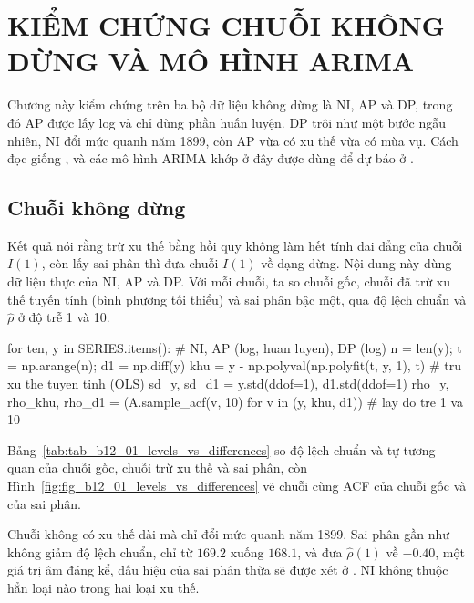\clearpage
\section[Kiểm chứng chuỗi không dừng và mô hình ARIMA]{KIỂM CHỨNG CHUỖI KHÔNG DỪNG VÀ MÔ HÌNH ARIMA}

Chương này kiểm chứng  trên ba bộ dữ liệu không dừng là NI, AP và DP, trong đó AP được lấy log và chỉ dùng phần huấn luyện. DP trôi như một bước ngẫu nhiên, NI đổi mức quanh năm 1899, còn AP vừa có xu thế vừa có mùa vụ. Cách đọc giống , và các mô hình ARIMA khớp ở đây được dùng để dự báo ở .

\subsection{Chuỗi không dừng}

 Kết quả  nói rằng trừ xu thế bằng hồi quy không làm hết tính dai dẳng của chuỗi $I(1)$, còn lấy sai phân thì đưa chuỗi $I(1)$ về dạng dừng.
 Nội dung này dùng dữ liệu thực của NI, AP và DP. Với mỗi chuỗi, ta so chuỗi gốc, chuỗi đã trừ xu thế tuyến tính (bình phương tối thiểu) và sai phân bậc một, qua độ lệch chuẩn và $\hat\rho$ ở độ trễ 1 và 10.
\begin{codeblock}
for ten, y in SERIES.items():                      # NI, AP (log, huan luyen), DP (log)
    n = len(y); t = np.arange(n); d1 = np.diff(y)
    khu = y - np.polyval(np.polyfit(t, y, 1), t)             # tru xu the tuyen tinh (OLS)
    sd_y, sd_d1 = y.std(ddof=1), d1.std(ddof=1)
    rho_y, rho_khu, rho_d1 = (A.sample_acf(v, 10) for v in (y, khu, d1))   # lay do tre 1 va 10
\end{codeblock}
 Bảng~\ref{tab:tab_b12_01_levels_vs_differences} so độ lệch chuẩn và tự tương quan của chuỗi gốc, chuỗi trừ xu thế và sai phân, còn Hình~\ref{fig:fig_b12_01_levels_vs_differences} vẽ chuỗi cùng ACF của chuỗi gốc và của sai phân.

 Chuỗi không có xu thế dài mà chỉ đổi mức quanh năm 1899. Sai phân gần như không giảm độ lệch chuẩn, chỉ từ $169.2$ xuống $168.1$, và đưa $\hat\rho(1)$ về $-0.40$, một giá trị âm đáng kể, dấu hiệu của sai phân thừa sẽ được xét ở . NI không thuộc hẳn loại nào trong hai loại xu thế.

